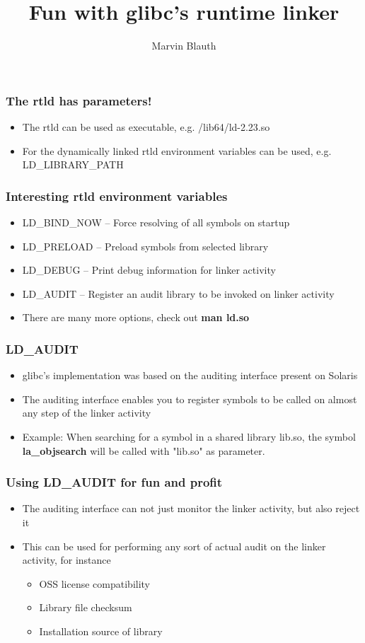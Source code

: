 \documentclass{beamer}
\title{Fun with glibc's runtime linker}
\author{Marvin Blauth}
\begin{document}
\frame{\titlepage}

\begin{frame}
  \frametitle{The rtld has parameters!}
  \begin{itemize}
    \item The rtld can be used as executable, e.g. /lib64/ld-2.23.so
    \item For the dynamically linked rtld environment variables can be used, e.g. LD\_LIBRARY\_PATH
  \end{itemize}
\end{frame}

\begin{frame}
  \frametitle{Interesting rtld environment variables}
  \begin{itemize}
    \item LD\_BIND\_NOW -- Force resolving of all symbols on startup
    \item LD\_PRELOAD -- Preload symbols from selected library
    \item LD\_DEBUG -- Print debug information for linker activity
    \item LD\_AUDIT -- Register an audit library to be invoked on linker activity
    \item There are many more options, check out \textbf{man ld.so}
  \end{itemize}
\end{frame}

\begin{frame}
  \frametitle{LD\_AUDIT}
  \begin{itemize}
    \item glibc's implementation was based on the auditing interface present on Solaris
    \item The auditing interface enables you to register symbols to be called on almost any step of the linker activity
    \item Example: When searching for a symbol in a shared library lib.so, the symbol \textbf{la\_objsearch} will be
          called with "lib.so" as parameter.
  \end{itemize}
\end{frame}

\begin{frame}
  \frametitle{Using LD\_AUDIT for fun and profit}
  \begin{itemize}
    \item The auditing interface can not just monitor the linker activity, but also reject it
    \item This can be used for performing any sort of actual audit on the linker activity, for instance
    \begin{itemize}
      \item OSS license compatibility
      \item Library file checksum
      \item Installation source of library
    \end{itemize}
  \end{itemize}
\end{frame}
\end{document}
